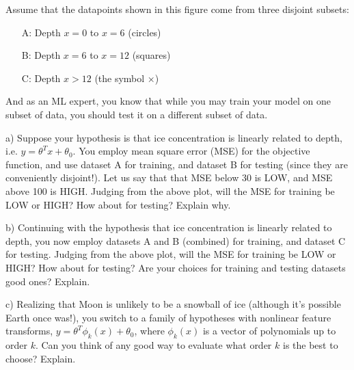 \documentclass[12pt]{article}
\begin{document}
	
	Assume that the datapoints shown in this figure come from three disjoint subsets:
	\begin{enumerate}
		\item[A:] Depth $x = 0$ to $x=6$ (circles)
		\item[B:] Depth $x = 6$ to $x =12$ (squares)
		\item[C:] Depth $x>12$ (the symbol ×)
	\end{enumerate}

	And as an ML expert, you know that while you may train your model on one subset of data, you should test it on a different subset of data.
	
	a) Suppose your hypothesis is that ice concentration is linearly related to depth, i.e. $y = \theta^T x + \theta_0$. You employ mean square error (MSE) for the objective function, and use dataset A for training, and dataset B for testing (since they are conveniently disjoint!). Let us say that that MSE below 30 is LOW, and MSE above 100 is HIGH. Judging from the above plot, will the MSE for training be LOW or HIGH? How about for testing? Explain why.
	
	b) Continuing with the hypothesis that ice concentration is linearly related to depth, you now employ datasets A and B (combined) for training, and dataset C for testing. Judging from the above plot, will the MSE for training be LOW or HIGH? How about for testing? Are your choices for training and testing datasets good ones? Explain.
	
	c) Realizing that Moon is unlikely to be a snowball of ice (although it’s possible Earth once was!), you switch to a family of hypotheses with nonlinear feature transforms, $y = \theta^T \phi_k(x) + \theta_0$, where $\phi_k(x)$ is a vector of polynomials up to order $k$. Can you think of any good way to evaluate what order $k$ is the best to choose? Explain.
	
	\vspace{10pt}
	
\end{document}
